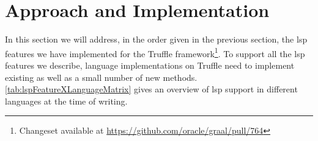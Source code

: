 \documentclass[sigplan,10pt,screen]{acmart}
\makeatletter
\renewcommand\paragraph{\@startsection{paragraph}{4}{\z@}%
   {-.2\baselineskip \@plus -2\p@ \@minus -.2\p@}%
   {-3.5\p@}%
   {\@parfont\@addspaceafter}}
\makeatother
\begin{document}


\section{Approach and Implementation}
\label{cha:solution}

In this section we will address, in the order given in the previous section, the
\ac{lsp} features we have implemented for the Truffle
framework\footnote{Changeset available at
  \url{https://github.com/oracle/graal/pull/764}}. To support all the \ac{lsp}
features we describe, language implementations on Truffle need to implement
existing as well as a small number of new \api
methods. \autoref{tab:lspFeatureXLanguageMatrix} gives an overview of \ac{lsp}
support in different languages at the time of writing.
\end{document}
